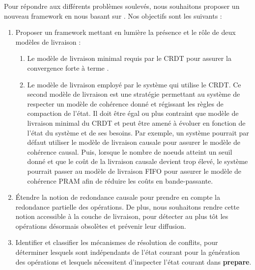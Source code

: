 Pour répondre aux différents problèmes soulevés, nous souhaitons proposer un nouveau framework en nous basant sur \cite{baquero2017pure}.
Nos objectifs sont les suivants :
\begin{enumerate}
    \item Proposer un framework mettant en lumière la présence et le rôle de deux modèles de livraison :
        \begin{enumerate}
            \item Le modèle de livraison minimal requis par le \ac{CRDT} pour assurer la convergence forte à terme \cite{shapiro_2011_crdt}.
            \item Le modèle de livraison employé par le système qui utilise le \ac{CRDT}.
                Ce second modèle de livraison est une stratégie permettant au système de respecter un modèle de cohérence donné et régissant les règles de compaction de l'état.
                Il doit être égal ou plus contraint que modèle de livraison minimal du \ac{CRDT} et peut être amené à évoluer en fonction de l'état du système et de ses besoins.
                Par exemple, un système pourrait par défaut utiliser le modèle de livraison causale pour assurer le modèle de cohérence causal.
                Puis, lorsque le nombre de noeuds atteint un seuil donné et que le coût de la livraison causale devient trop élevé, le système pourrait passer au modèle de livraison FIFO pour assurer le modèle de cohérence PRAM afin de réduire les coûts en bande-passante.
        \end{enumerate}
    \item Étendre la notion de redondance causale pour prendre en compte la redondance partielle des opérations.
        De plus, nous souhaitons rendre cette notion accessible à la couche de livraison, pour détecter au plus tôt les opérations désormais obsolètes et prévenir leur diffusion.
    \item Identifier et classifier les mécanismes de résolution de conflits, pour déterminer lesquels sont indépendants de l'état courant pour la génération des opérations et lesquels nécessitent d'inspecter l'état courant dans \textbf{prepare}.
\end{enumerate}
